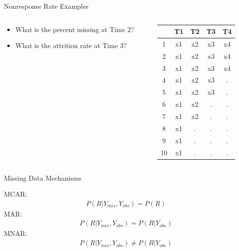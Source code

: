 \documentclass{beamer}\usepackage[]{graphicx}\usepackage[]{color}
\begin{document}
\begin{frame}{Nonresponse Rate Examples}
  
  \begin{columns}
    \begin{column}{0.5\textwidth}
      
      \begin{itemize}
        \item What is the percent missing at Time 2?
          \vc
        \item What is the attrition rate at Time 3?
      \end{itemize}
      
    \end{column}
    \begin{column}{0.5\textwidth}
      
\begin{table}[ht]
\centering
\begin{tabular}{ccccc}
  \toprule
 & T1 & T2 & T3 & T4 \\ 
  \midrule
1 & x1 & x2 & x3 & x4 \\ 
  2 & x1 & x2 & x3 & x4 \\ 
  3 & x1 & x2 & x3 & x4 \\ 
  4 & x1 & x2 & x3 & . \\ 
  5 & x1 & x2 & x3 & . \\ 
  6 & x1 & x2 & . & . \\ 
  7 & x1 & x2 & . & . \\ 
  8 & x1 & . & . & . \\ 
  9 & x1 & . & . & . \\ 
  10 & x1 & . & . & . \\ 
   \bottomrule
\end{tabular}
\end{table}


\end{column}
\end{columns}

\end{frame}

\watermarkon %



\begin{frame}{Missing Data Mechanisms}

  MCAR:
  \begin{align*}
    P(R | Y_{mis}, Y_{obs}) = P(R)
  \end{align*}
  MAR:
  \begin{align*}
    P(R | Y_{mis}, Y_{obs}) = P(R | Y_{obs})
  \end{align*}
  MNAR:
  \begin{align*}
    P(R | Y_{mis}, Y_{obs}) \neq P(R | Y_{obs})
  \end{align*}
  
\end{frame}
\end{document}

